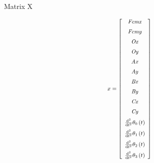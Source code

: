 Matrix X

\begin{equation}\label{MatX}\scalemath{0.8}{x =  \left[ \begin {array}{c} {\it Fcmx}\\ \noalign{\medskip}{\it Fcmy}
\\ \noalign{\medskip}{\it Ox}\\ \noalign{\medskip}{\it Oy}
\\ \noalign{\medskip}{\it Ax}\\ \noalign{\medskip}{\it Ay}
\\ \noalign{\medskip}{\it Bx}\\ \noalign{\medskip}{\it By}
\\ \noalign{\medskip}{\it Cx}\\ \noalign{\medskip}{\it Cy}
\\ \noalign{\medskip}{\frac {{\rm d}^{2}}{{\rm d}{t}^{2}}}\theta_{{0}}
 \left( t \right) \\ \noalign{\medskip}{\frac {{\rm d}^{2}}{{\rm d}{t}
^{2}}}\theta_{{1}} \left( t \right) \\ \noalign{\medskip}{\frac {
{\rm d}^{2}}{{\rm d}{t}^{2}}}\theta_{{2}} \left( t \right) 
\\ \noalign{\medskip}{\frac {{\rm d}^{2}}{{\rm d}{t}^{2}}}\theta_{{3}}
 \left( t \right) \end {array} \right]
}
\end{equation}

